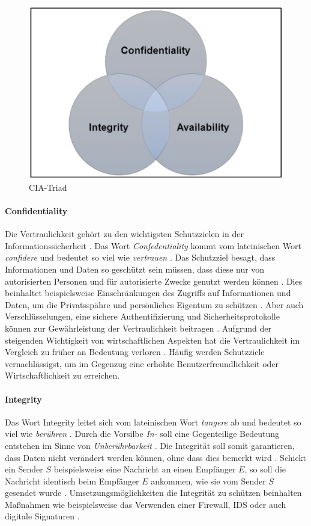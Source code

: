 \begin{figure}[h]
	\centering 
	\includegraphics[width=0.5
    \textwidth]{img/abbildungen/CIA-Triad.png}
	\captionsetup{format=hang}
	\caption{CIA-Triad} \label{CIA-Triad}
\end{figure}

\paragraph*{Confidentiality} 
Die Vertraulichkeit gehört zu den wichtigsten Schutzzielen in der Informationssicherheit \cite{samonas2014cia}. Das Wort \textit{Confedentiality} kommt vom lateinischen Wort \textit{confidere} und bedeutet so viel wie \textit{vertrauen} \cite{pons} \cite{samonas2014cia}. Das Schutzziel besagt, dass Informationen und Daten so geschützt sein müssen, dass diese nur von autorisierten Personen und für autorisierte Zwecke genutzt werden können \cite{samonas2014cia}. 
Dies beinhaltet beispielsweise Einschränkungen des Zugriffs auf Informationen und Daten, um die Privatsspähre und persönliches Eigentum zu schützen \cite{samonas2014cia}. Aber auch Verschlüsselungen, eine sichere Authentifizierung und Sicherheitsprotokolle können zur Gewährleistung der Vertraulichkeit beitragen \cite{agarwal2011security}.
Aufgrund der steigenden Wichtigkeit von wirtschaftlichen Aspekten hat die Vertraulichkeit im Vergleich zu früher an Bedeutung verloren \cite{samonas2014cia}. Häufig werden Schutzziele vernachlässigst, um im Gegenzug eine erhöhte Benutzerfreundlichkeit oder Wirtschaftlichkeit zu erreichen.

\paragraph*{Integrity}  
Das Wort Integrity leitet sich vom lateinischen Wort \textit{tangere} ab und bedeutet so viel wie \textit{berühren} \cite{pons}. Durch die Vorsilbe \textit{In-} soll eine Gegenteilige Bedeutung entstehen im Sinne von \textit{Unberührbarkeit} \cite{samonas2014cia}. 
Die Integrität soll somit garantieren, dass Daten nicht verändert werden können, ohne dass dies bemerkt wird \cite{agarwal2011security}. Schickt ein Sender $S$ beispielsweise eine Nachricht an einen Empfänger $E$, so soll die Nachricht identisch beim Empfänger $E$ ankommen, wie sie vom Sender $S$ gesendet wurde \cite{agarwal2011security}.
Umsetzungsmöglichkeiten die Integrität zu schützen beinhalten Maßnahmen wie beispielsweise das Verwenden einer Firewall, \ac{IDS} oder auch digitale Signaturen \cite{agarwal2011security}.
